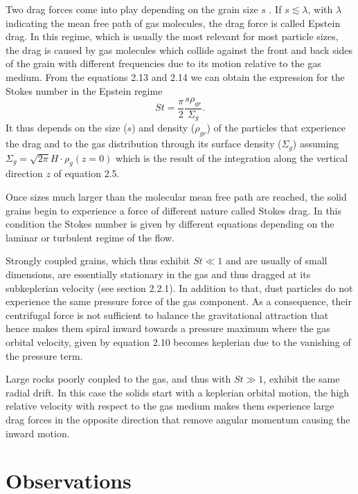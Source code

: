 \documentclass[a4paper,10pt]{report}
\begin{document}
Two drag forces come into play depending on the grain size $s$ \cite[pp. 110,111]{book_planet_form}. 
If $s \lesssim \lambda$, with $\lambda$ indicating the mean free path of gas molecules, 
the drag force is called Epstein drag. 
In this regime, which is usually the most relevant for most particle sizes, 
the drag is caused by gas molecules which collide against the front and back sides of the grain with different 
frequencies due to its motion relative to the gas medium.
From the equations 2.13 and 2.14 we can obtain the expression 
for the Stokes number in the Epstein regime 
\begin{equation}
    St = \frac{\pi}{2}\frac{s\rho_{gr}}{\Sigma_g}.
\end{equation}
It thus depends on the size ($s$)
and density ($\rho_{gr}$) of the particles that experience the drag
and to the gas distribution through its
surface density ($\Sigma_g$) assuming 
$\Sigma_g = \sqrt{2\pi}H\cdot \rho_g(z=0)$ which is the result of the integration
along the vertical direction $z$ of equation 2.5.

Once sizes much larger than the molecular 
mean free path are reached, the solid grains begin to experience a force of different nature called Stokes drag.
In this condition the Stokes number is given by different
equations depending on the laminar or turbulent regime
of the flow.

Strongly coupled grains, which thus exhibit $St \ll 1$ and are usually of small dimensions,
are essentially stationary in the gas and thus dragged 
at its subkeplerian velocity (see section 2.2.1). In addition to that,
dust particles do not experience the same pressure force of the gas component.
As a consequence, their centrifugal force is not sufficient to balance the gravitational attraction 
that hence makes them spiral inward towards a pressure maximum where the gas orbital velocity, given by equation 
2.10 becomes keplerian due to the vanishing of the pressure term.

Large rocks poorly coupled to the gas, and thus with $St \gg 1$, exhibit the same radial drift. 
In this case the solids start with a keplerian orbital motion, the high relative velocity with respect to the gas
medium makes them esperience large drag forces in the opposite direction that remove angular momentum causing 
the inward motion.

\section{Observations}
\end{document}
